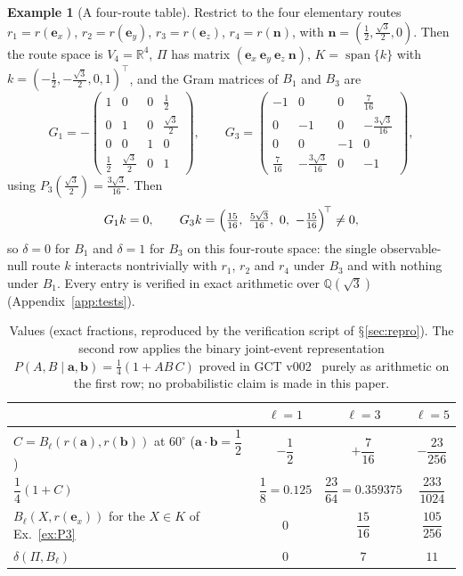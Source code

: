 \documentclass[11pt,a4paper]{article}
\renewcommand{\S}{\ensuremath{\mathsection}}
\newcommand{\RR}{\mathbb{R}}
\newcommand{\spn}{\operatorname{span}}
\newcommand{\defic}{\delta}
\theoremstyle{plain}
\theoremstyle{definition}
\newtheorem{example}[theorem]{Example}
\begin{document}
\begin{example}[A four-route table]\label{ex:four}
Restrict to the four elementary routes $r_1=r(\mathbf e_x)$, $r_2=r(\mathbf e_y)$, $r_3=r(\mathbf e_z)$, $r_4=r(\mathbf n)$, with $\mathbf n=(\tfrac12,\tfrac{\sqrt3}2,0)$. Then the route space is $V_4=\RR^4$, $\Pi$ has matrix $(\mathbf e_x\ \mathbf e_y\ \mathbf e_z\ \mathbf n)$, $K=\spn\{k\}$ with $k=(-\tfrac12,-\tfrac{\sqrt3}2,0,1)^{\!\top}$, and the Gram matrices of $B_1$ and $B_3$ are
\[
G_1=-\begin{pmatrix}1&0&0&\tfrac12\\0&1&0&\tfrac{\sqrt3}2\\0&0&1&0\\\tfrac12&\tfrac{\sqrt3}2&0&1\end{pmatrix},\qquad
G_3=\begin{pmatrix}-1&0&0&\tfrac7{16}\\0&-1&0&-\tfrac{3\sqrt3}{16}\\0&0&-1&0\\\tfrac7{16}&-\tfrac{3\sqrt3}{16}&0&-1\end{pmatrix},
\]
using $P_3(\tfrac{\sqrt3}2)=\tfrac{3\sqrt3}{16}$. Then
\[ G_1k=0,\qquad G_3k=\Bigl(\tfrac{15}{16},\ \tfrac{5\sqrt3}{16},\ 0,\ -\tfrac{15}{16}\Bigr)^{\!\top}\neq0, \]
so $\defic=0$ for $B_1$ and $\defic=1$ for $B_3$ on this four-route space: the single observable-null route $k$ interacts nontrivially with $r_1$, $r_2$ and $r_4$ under $B_3$ and with nothing under $B_1$. Every entry is verified in exact arithmetic over $\mathbb Q(\sqrt3)$ (Appendix~\ref{app:tests}).
\end{example}

\begin{table}[t]
\centering\small
\renewcommand{\arraystretch}{1.55}
\begin{tabular}{@{}lccc@{}}
\toprule
 & $\ell=1$ & $\ell=3$ & $\ell=5$\\
\midrule
$C=B_\ell(r(\mathbf a),r(\mathbf b))$ at $60^\circ$ ($\mathbf a\!\cdot\!\mathbf b=\dfrac12$) & $-\dfrac12$ & $+\dfrac7{16}$ & $-\dfrac{23}{256}$\\
$\dfrac14(1+C)$ & $\dfrac18=0.125$ & $\dfrac{23}{64}=0.359375$ & $\dfrac{233}{1024}$\\
$B_\ell(X,r(\mathbf e_x))$ for the $X\in K$ of Ex.~\ref{ex:P3} & $0$ & $\dfrac{15}{16}$ & $\dfrac{105}{256}$\\
$\defic(\Pi,B_\ell)$ & $0$ & $7$ & $11$\\
\bottomrule
\end{tabular}
\caption{Values (exact fractions, reproduced by the verification script of \S\ref{sec:repro}). The second row applies the binary joint-event representation $P(A,B\mid\mathbf a,\mathbf b)=\tfrac14(1+AB\,C)$ proved in GCT v002~\cite{G2} purely as arithmetic on the first row; no probabilistic claim is made in this paper.}\label{tab:legendre}
\end{table}
\end{document}
